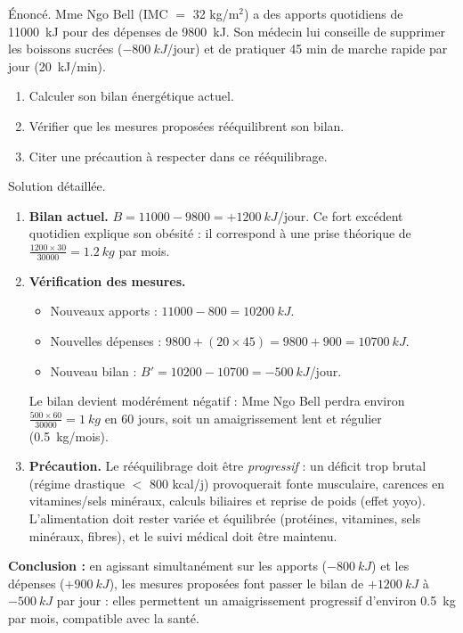 \documentclass[11pt]{article}
\begin{document}
\begin{exoresolu}
Énoncé. Mme Ngo Bell (IMC $=$ 32 kg/m$^2$) a des apports quotidiens de \SI{11000}{kJ} pour des dépenses de \SI{9800}{kJ}. Son médecin lui conseille de supprimer les boissons sucrées ($-\SI{800}{kJ}$/jour) et de pratiquer 45 min de marche rapide par jour (\SI{20}{kJ/min}).
\begin{enumerate}
\item Calculer son bilan énergétique actuel.
\item Vérifier que les mesures proposées rééquilibrent son bilan.
\item Citer une précaution à respecter dans ce rééquilibrage.
\end{enumerate}
\tcblower
Solution détaillée.
\begin{enumerate}
\item \textbf{Bilan actuel.} $B = 11000 - 9800 = +\SI{1200}{kJ}$/jour. Ce fort excédent quotidien explique son obésité : il correspond à une prise théorique de $\frac{1200 \times 30}{30000} = \SI{1,2}{kg}$ par mois.
\item \textbf{Vérification des mesures.}
\begin{itemize}
\item Nouveaux apports : $11000 - 800 = \SI{10200}{kJ}$.
\item Nouvelles dépenses : $9800 + (20 \times 45) = 9800 + 900 = \SI{10700}{kJ}$.
\item Nouveau bilan : $B' = 10200 - 10700 = -\SI{500}{kJ}$/jour.
\end{itemize}
Le bilan devient modérément négatif : Mme Ngo Bell perdra environ $\frac{500 \times 60}{30000} = \SI{1}{kg}$ en 60 jours, soit un amaigrissement lent et régulier (\SI{0,5}{kg}/mois).
\item \textbf{Précaution.} Le rééquilibrage doit être \emph{progressif} : un déficit trop brutal (régime drastique $<$ 800 kcal/j) provoquerait fonte musculaire, carences en vitamines/sels minéraux, calculs biliaires et reprise de poids (effet yoyo). L'alimentation doit rester variée et équilibrée (protéines, vitamines, sels minéraux, fibres), et le suivi médical doit être maintenu.
\end{enumerate}
\textbf{Conclusion :} en agissant simultanément sur les apports ($-\SI{800}{kJ}$) et les dépenses ($+\SI{900}{kJ}$), les mesures proposées font passer le bilan de $+\SI{1200}{kJ}$ à $-\SI{500}{kJ}$ par jour : elles permettent un amaigrissement progressif d'environ \SI{0,5}{kg} par mois, compatible avec la santé.
\end{exoresolu}
\end{document}

